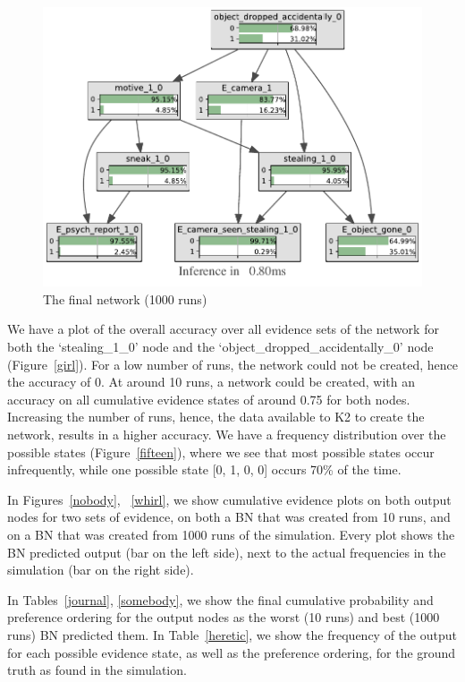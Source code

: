 \documentclass[12pt]{article}
\begin{document}
\begin{figure}[htbp]
\begin{center}
\includegraphics[width=\linewidth]{GroteMarktPrivateEND/bnImage/BNIMAGEGroteMarktPrivate1000.pdf}
\caption{The final network (1000 runs)}
\label{bullet}
\end{center}
\end{figure}



We have a plot of the overall accuracy over all evidence sets of the network for both the `stealing\_1\_0' node and the `object\_dropped\_accidentally\_0' node (Figure~\ref{girl}). For a low number of runs, the network could not be created, hence the accuracy of 0. At around 10 runs, a network could be created, with an accuracy on all cumulative evidence states of around 0.75 for both nodes. Increasing the number of runs, hence, the data available to K2 to create the network, results in a higher accuracy. We have a frequency distribution over the possible states (Figure~\ref{fifteen}), where we see that most possible states occur infrequently, while one possible state [0, 1, 0, 0] occurs 70\% of the time. 

In Figures~\ref{nobody}, ~\ref{whirl}, we show cumulative evidence plots on both output nodes for two sets of evidence, on both a BN that was created from 10 runs, and on a BN that was created from 1000 runs of the simulation. Every plot shows the BN predicted output (bar on the left side), next to the actual frequencies in the simulation (bar on the right side).

In Tables~\ref{journal}, \ref{somebody}, we show the final cumulative probability and preference ordering for the output nodes as the worst (10 runs) and best (1000 runs) BN predicted them. In Table~\ref{heretic}, we show the frequency of the output for each possible evidence state, as well as the preference ordering, for the ground truth as found in the simulation.
\end{document}

